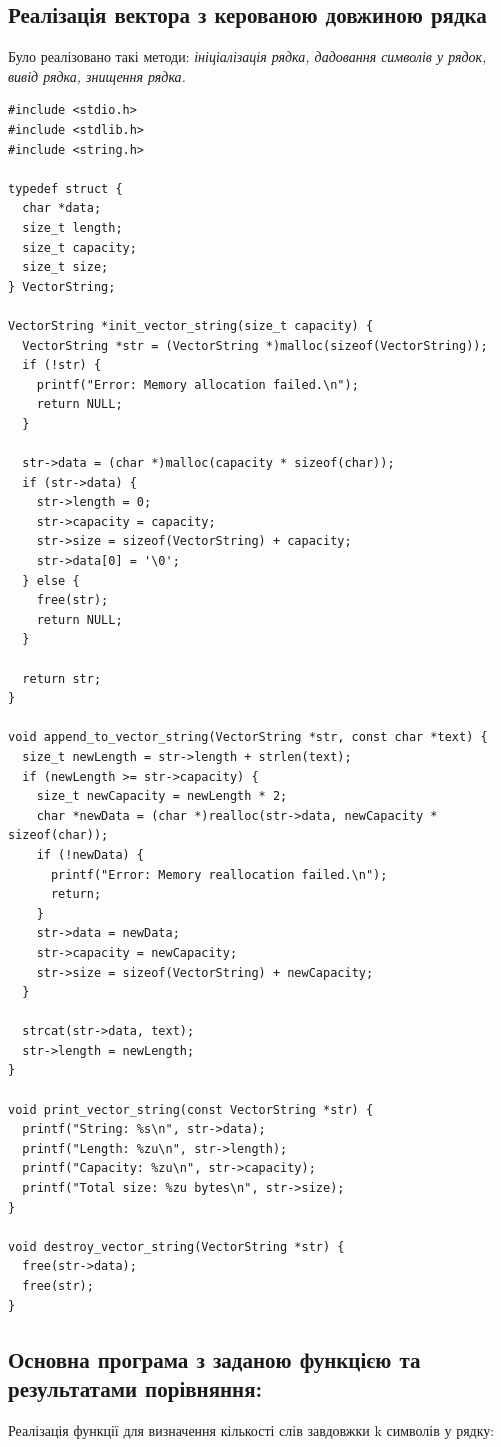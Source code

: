 \clearpage
\subsection{Реалізація вектора з керованою довжиною рядка}

	Було реалізовано такі методи: \textit{ініціалізація рядка, дадовання символів у рядок, 
вивід рядка, знищення рядка.}
  
\begin{lstlisting}[style=customc]
#include <stdio.h>
#include <stdlib.h>
#include <string.h>

typedef struct {
  char *data;
  size_t length;
  size_t capacity;
  size_t size;
} VectorString;

VectorString *init_vector_string(size_t capacity) {
  VectorString *str = (VectorString *)malloc(sizeof(VectorString));
  if (!str) {
    printf("Error: Memory allocation failed.\n");
    return NULL;
  }

  str->data = (char *)malloc(capacity * sizeof(char));
  if (str->data) {
    str->length = 0;
    str->capacity = capacity;
    str->size = sizeof(VectorString) + capacity;
    str->data[0] = '\0';
  } else {
    free(str);
    return NULL;
  }

  return str;
}

void append_to_vector_string(VectorString *str, const char *text) {
  size_t newLength = str->length + strlen(text);
  if (newLength >= str->capacity) {
    size_t newCapacity = newLength * 2;
    char *newData = (char *)realloc(str->data, newCapacity * sizeof(char));
    if (!newData) {
      printf("Error: Memory reallocation failed.\n");
      return;
    }
    str->data = newData;
    str->capacity = newCapacity;
    str->size = sizeof(VectorString) + newCapacity;
  }

  strcat(str->data, text);
  str->length = newLength;
}

void print_vector_string(const VectorString *str) {
  printf("String: %s\n", str->data);
  printf("Length: %zu\n", str->length);
  printf("Capacity: %zu\n", str->capacity);
  printf("Total size: %zu bytes\n", str->size);
}

void destroy_vector_string(VectorString *str) {
  free(str->data);
  free(str);
}

\end{lstlisting}

\subsection{Основна програма з заданою функцією та результатами порівняння:}
Реалізація функції для визначення кількості слів завдовжки k символів у рядку:

